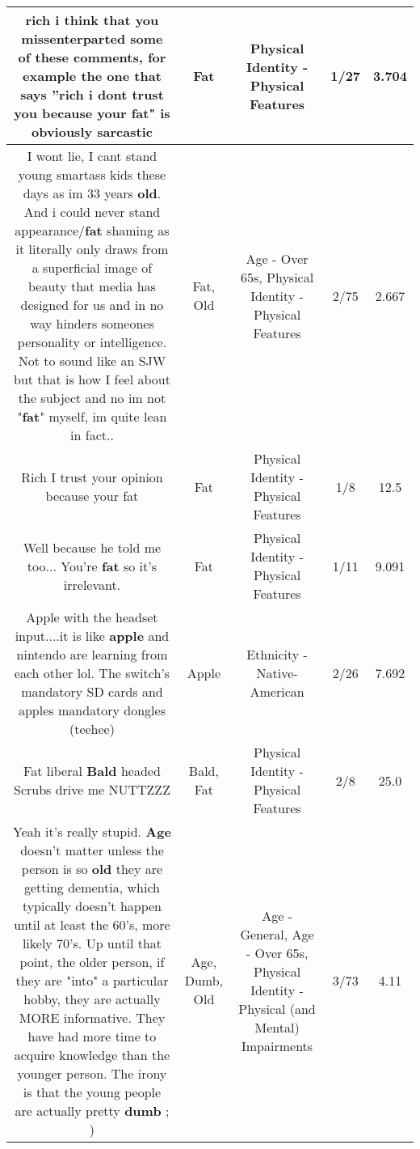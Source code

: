 \documentclass[11pt]{article}
\newlength\mylength
\begin{document}
\begin{center}
\begin{longtable}{|C{.65\mylength}|C{.30\mylength}|C{.12\mylength}|C{.12\mylength}|C{.12\mylength}|}
  \small rich i think that you missenterparted some of these comments, for example the one that says  ''rich i dont trust you because your \textbf{fat}" is obviously sarcastic\normalsize   & Fat & Physical Identity - Physical Features & 1/27 & 3.704 \\  \hline
  \small I wont lie, I cant stand young smartass kids these days as im 33 years \textbf{old}. And i could never stand appearance/\textbf{fat} shaming as it literally only draws from a superficial image of beauty that media has designed for us and in no way hinders someones personality or intelligence. Not to sound like an SJW but that is how I feel about the subject and no im not "\textbf{fat}" myself, im quite lean in fact..\normalsize   & Fat, Old & Age - Over 65s, Physical Identity - Physical Features & 2/75 & 2.667 \\  \hline
  \small Rich I trust your opinion because your fat\normalsize   & Fat & Physical Identity - Physical Features & 1/8 & 12.5 \\  \hline
  \small Well because he told me too... You're \textbf{fat} so it's irrelevant.\normalsize   & Fat & Physical Identity - Physical Features & 1/11 & 9.091 \\  \hline
  \small Apple with the headset input....it is like \textbf{apple} and nintendo are learning from each other lol. The switch's mandatory SD cards and apples mandatory dongles (teehee)\normalsize   & Apple & Ethnicity - Native-American & 2/26 & 7.692 \\  \hline
  \small Fat liberal \textbf{Bald} headed Scrubs drive me NUTTZZZ\normalsize   & Bald, Fat & Physical Identity - Physical Features & 2/8 & 25.0 \\  \hline
  \small Yeah it's really stupid.  \textbf{Age} doesn't matter unless the person is so \textbf{old} they are getting dementia, which typically doesn't happen until at least the 60's, more likely 70's.  Up until that point, the older person, if they are "into" a particular hobby, they are actually MORE informative.  They have had more time to acquire knowledge than the younger person.  The irony is that the young people are actually pretty \textbf{dumb} ; )\normalsize   & Age, Dumb, Old & Age - General, Age - Over 65s, Physical Identity - Physical (and Mental) Impairments & 3/73 & 4.11 \\  \hline

\end{longtable}
\end{center}
\end{document}
